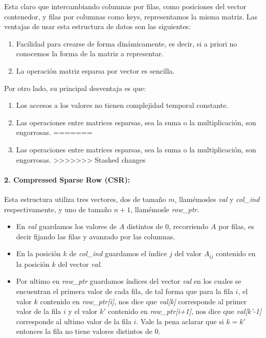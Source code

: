 Esta claro que intercambiando columnas por filas, como posiciones del vector contenedor, y filas por columnas como keys, representamos la misma matriz.
\newline
\newline
Las ventajas de usar esta estructura de datos son las siguientes:
\begin{enumerate}
  \item Facilidad para crearse de forma dinámicamente, es decir, si a priori no conocemos la forma de la matriz a representar.
  \item La operación matriz esparsa por vector es sencilla.
\end{enumerate}
Por otro lado, su principal desventaja es que:
\begin{enumerate}
<<<<<<< Updated upstream
  \item Los accesos a los valores no tienen complejidad temporal constante.
  \item Las operaciones entre matrices esparsas, sea la suma o la multiplicación, son engorrosas.
=======
  \item Las operaciones entre matrices esparsas, sea la suma o la multiplicación, son engorrosas.
>>>>>>> Stashed changes
\end{enumerate}

\paragraph{2. Compressed Sparse Row (CSR):}

Esta estructura utiliza tres vectores, dos de tamaño $m$, llamémosles \textit{val} y \textit{col_ind} respectivamente, y uno de tamaño $n+1$, llamémosle \textit{row_ptr}.
\begin{itemize}
    \item En \textit{val} guardamos los valores de $A$ distintos de 0, recorriendo $A$ por filas, es decir fijando las filas y avanzado por las columnas.
    \item En la posición $k$ de \textit{col_ind} guardamos el índice $j$ del valor $A_{ij}$ contenido en la posición $k$ del vector \textit{val}.
    \item Por ultimo en \textit{row_ptr} guardamos índices del vector \textit{val} en los cuales se encuentran el primera valor de cada fila, de tal
     forma que para la fila $i$, el valor $k$ contenido en \textit{row_ptr[i]}, nos dice que \textit{val[k]} corresponde al primer valor de la fila
      $i$ y el valor $k'$ contenido en \textit{row_ptr[i+1]}, nos dice que \textit{val[k'-1]} corresponde al ultimo valor de la fila $i$.
      Vale la pena aclarar que si $k = k'$ entonces la fila no tiene valores distintos de 0.
\end{itemize}

